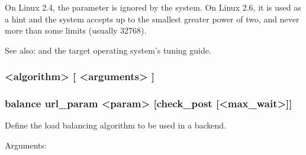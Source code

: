  On Linux 2.4, the parameter is ignored by the system. On Linux 2.6, it is
  used as a hint and the system accepts up to the smallest greater power of
  two, and never more than some limits (usually 32768).

  See also:  and the target operating system's tuning guide.

\subsubsection[balance] { <algorithm> [ <arguments> ]}
\subsubsection*{balance url\_param <param> [check\_post [<max\_wait>]]}

  Define the load balancing algorithm to be used in a backend.

  
  Arguments:
